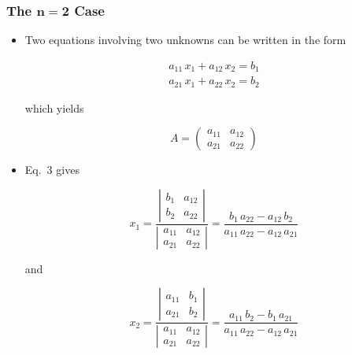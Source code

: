 \documentclass[12pt]{article}
\begin{document}
\subsubsection*{The $\mathbf{n=2}$ Case}
\begin{itemize}
\item Two equations involving two unknowns can be written in the form 

\begin{equation}
\begin{array}{c}
a_{11} \, x_1 + a_{12} \, x_2 = b_{1} \\
a_{21} \, x_1 + a_{22} \, x_2 = b_{2} 
\end{array}
\end{equation}

\noindent
which yields

\begin{equation}
A = 
\left(
\begin{array}{cc}
a_{11} & a_{12} \\
a_{21} & a_{22} 
\end{array}
\right)
\end{equation}

\item Eq.~3 %
  gives

\begin{equation}
x_1 = 
\frac{
\left|
\begin{array}{cc}
b_1 & a_{12} \\
b_2 & a_{22} 
\end{array}
\right|
}{
\left|
\begin{array}{cc}
a_{11} & a_{12} \\
a_{21} & a_{22} 
\end{array}
\right|
}
=
\frac{b_1 \, a_{22} - a_{12} \, b_2}
{a_{11} \, a_{22} - a_{12} \, a_{21}}
\end{equation}

\noindent
and

\begin{equation}
x_2 = \frac{
\left|
\begin{array}{cc}
a_{11} & b_1 \\
a_{21} & b_2 
\end{array}
\right|
}{
\left|
\begin{array}{cc}
a_{11} & a_{12} \\
a_{21} & a_{22} 
\end{array}
\right|
}
=
\frac{a_{11} \, b_2 - b_1 \, a_{21}}
{a_{11} \, a_{22} - a_{12} \, a_{21}}
\end{equation}

\end{itemize}
\end{document}
